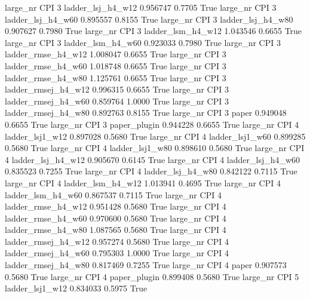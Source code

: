  large_nr      CPI                 3   ladder_lsj_h4_w12   0.956747      0.7705    True
  large_nr      CPI                 3   ladder_lsj_h4_w60   0.895557      0.8155    True
  large_nr      CPI                 3   ladder_lsj_h4_w80   0.907627      0.7980    True
  large_nr      CPI                 3   ladder_lsm_h4_w12   1.043546      0.6655    True
  large_nr      CPI                 3   ladder_lsm_h4_w60   0.923033      0.7980    True
  large_nr      CPI                 3  ladder_rmse_h4_w12   1.008047      0.6655    True
  large_nr      CPI                 3  ladder_rmse_h4_w60   1.018748      0.6655    True
  large_nr      CPI                 3  ladder_rmse_h4_w80   1.125761      0.6655    True
  large_nr      CPI                 3 ladder_rmsej_h4_w12   0.996315      0.6655    True
  large_nr      CPI                 3 ladder_rmsej_h4_w60   0.859764      1.0000    True
  large_nr      CPI                 3 ladder_rmsej_h4_w80   0.892763      0.8155    True
  large_nr      CPI                 3               paper   0.949048      0.6655    True
  large_nr      CPI                 3        paper_plugin   0.944228      0.6655    True
  large_nr      CPI                 4     ladder_lsj1_w12   0.897028      0.5680    True
  large_nr      CPI                 4     ladder_lsj1_w60   0.899285      0.5680    True
  large_nr      CPI                 4     ladder_lsj1_w80   0.898610      0.5680    True
  large_nr      CPI                 4   ladder_lsj_h4_w12   0.905670      0.6145    True
  large_nr      CPI                 4   ladder_lsj_h4_w60   0.835523      0.7255    True
  large_nr      CPI                 4   ladder_lsj_h4_w80   0.842122      0.7115    True
  large_nr      CPI                 4   ladder_lsm_h4_w12   1.013941      0.4695    True
  large_nr      CPI                 4   ladder_lsm_h4_w60   0.867537      0.7115    True
  large_nr      CPI                 4  ladder_rmse_h4_w12   0.951428      0.5680    True
  large_nr      CPI                 4  ladder_rmse_h4_w60   0.970600      0.5680    True
  large_nr      CPI                 4  ladder_rmse_h4_w80   1.087565      0.5680    True
  large_nr      CPI                 4 ladder_rmsej_h4_w12   0.957274      0.5680    True
  large_nr      CPI                 4 ladder_rmsej_h4_w60   0.795303      1.0000    True
  large_nr      CPI                 4 ladder_rmsej_h4_w80   0.817469      0.7255    True
  large_nr      CPI                 4               paper   0.907573      0.5680    True
  large_nr      CPI                 4        paper_plugin   0.899408      0.5680    True
  large_nr      CPI                 5     ladder_lsj1_w12   0.834033      0.5975    True
